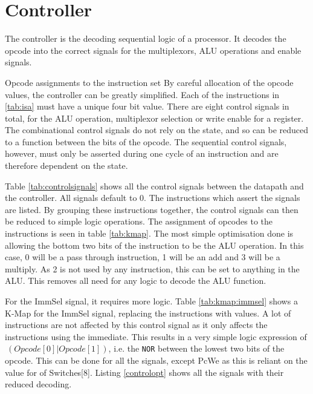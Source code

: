 

\section{Controller}\label{sect:controller}

The controller is the decoding sequential logic of a processor. 
It decodes the opcode into the correct signals for the multiplexors, ALU operations and enable signals.


Opcode assignments to the instruction set
By careful allocation of the opcode values, the controller can be greatly simplified. 
Each of the instructions in \ref{tab:isa} must have a unique four bit value. 
There are eight control signals in total, for the ALU operation, multiplexor selection or write enable for a register. 
The combinational control signals do not rely on the state, and so can be reduced to a function between the bits of the opcode. 
The sequential control signals, however, must only be asserted during one cycle of an instruction and are therefore dependent on the state. 

Table \ref{tab:controlsignals} shows all the control signals between the datapath and the controller. 
All signals default to 0.
The instructions which assert the signals are listed. 
By grouping these instructions together, the control signals can then be reduced to simple logic operations.
The assignment of opcodes to the instructions is seen in table \ref{tab:kmap}. 
The most simple optimisation done is allowing the bottom two bits of the instruction to be the ALU operation. 
In this case, 0 will be a pass through instruction, 1 will be an add and 3 will be a multiply. 
As 2 is not used by any instruction, this can be set to anything in the ALU.
This removes all need for any logic to decode the ALU function. 

For the ImmSel signal, it requires more logic. 
Table \ref{tab:kmap:immsel} shows a K-Map for the ImmSel signal, replacing the instructions with values.
A lot of instructions are not affected by this control signal as it only affects the instructions using the immediate. 
This results in a very simple logic expression of $~(Opcode[0] | Opcode[1])$, i.e. the \texttt{NOR} between the lowest two bits of the opcode. 
This can be done for all the signals, except PcWe as this is reliant on the value for of Switches[8]. 
Listing \ref{controlopt} shows all the signals with their reduced decoding. 

